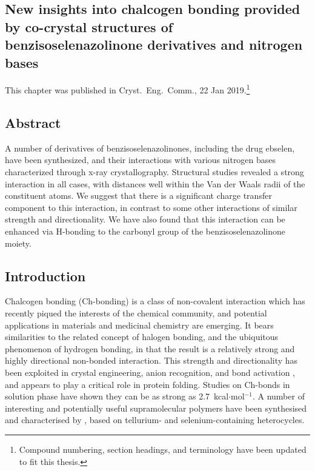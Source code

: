 \begin{refsection}

    \chapter[Insights from co-crystal structures]{New insights into chalcogen bonding provided by co-crystal structures of benzisoselenazolinone derivatives and nitrogen bases}\label{ch:crystengcomm1}
    
    This chapter was published in Cryst.\ Eng.\ Comm., 22 Jan 2019\autocite{Fellowes2019}.\footnote{Compound numbering, section headings, and terminology have been updated to fit this thesis.}
    
    \section{Abstract}
    A number of derivatives of benzisoselenazolinones, including the drug ebselen, have been synthesized, and their interactions with various nitrogen bases characterized through x-ray crystallography.
    Structural studies revealed a strong interaction in all cases, with  distances well within the Van der Waals radii of the constituent atoms.
    We suggest that there is a significant charge transfer component to this interaction, in contrast to some other interactions of similar strength and directionality.
    We have also found that this interaction can be enhanced via H-bonding to the carbonyl group of the benzisoselenazolinone moiety.
    
    
    \section{Introduction}
    Chalcogen bonding (Ch-bonding) is a class of non-covalent interaction which has recently piqued the interests of the chemical community, and potential applications in materials and medicinal chemistry are emerging.\autocite{Mitchell2017,Wonner2017a,Fanfrlik2014,Vogel2019}
    It bears similarities to the related concept of halogen bonding, and the ubiquitous phenomenon of hydrogen bonding, in that the result is a relatively strong and highly directional non-bonded interaction.\autocite{Paolo1974}
    This strength and directionality has been exploited in crystal engineering\autocite{Gleiter2003,Kremer2016,Huynh2017}, anion recognition\autocite{Lim2017,Lim2018,Garrett2016}, and bond activation \autocite{Wonner2017,Benz2017,Benz2017a}, and appears to play a critical role in protein folding.\autocite{Iwaoka2001,Iwaoka2015}
    Studies on  Ch-bonds in solution phase have shown they can be as strong as 2.7~kcal$\cdot$mol$^{-1}$\autocite{Garrett2015a}.
    A number of interesting and potentially useful supramolecular polymers have been synthesised and characterised by \citeauthor{Ho2016}, based on tellurium- and selenium-containing heterocycles.\autocite{Ho2016,Ho2017}
    

\end{refsection}
